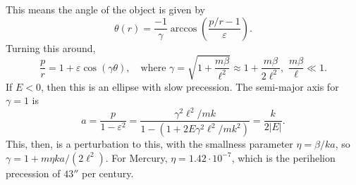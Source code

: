 \documentclass{article}
\begin{document}
        This means the angle of the object is given by
        \begin{equation*}
            \theta(r) = \frac{-1}{\gamma} \arccos\left(\frac{p/r - 1}{\varepsilon}\right).
        \end{equation*}
        Turning this around,
        \begin{equation*}
            \frac{p}{r} = 1 + \varepsilon\cos(\gamma \theta), \quad \mathrm{where}  \,\, \gamma = \sqrt{1 + \frac{m \beta}{\ell^2}} \approx 1 + \frac{m \beta}{2 \ell^2}, \, \, \frac{m \beta}{\ell} \ll 1.
        \end{equation*}
        If $E<0$, then this is an ellipse with slow precession. The semi-major axis for $\gamma = 1$ is
        \begin{equation*}
            a = \frac{p}{1 - \varepsilon^2} = \frac{\gamma^2 \ell^2 / m k}{1 - \left(1 + 2 E \gamma^2 \ell^2/ m k^2\right)} = \frac{k}{2 |E|}.
        \end{equation*}
        This, then, is a perturbation to this, with the smallness parameter $\eta = \beta/k a$, so $\gamma = 1 + m \eta k a / (2 \ell^2)$. For Mercury, $\eta = 1.42 \cdot 10^{-7}$, which is the perihelion precession of $43''$ per century.
\end{document}
